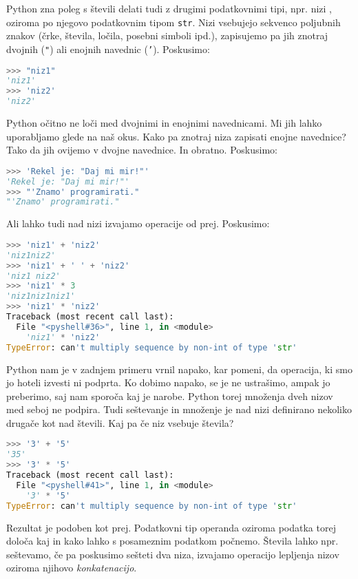 Python zna poleg s števili delati tudi z drugimi podatkovnimi tipi, npr. nizi , oziroma po njegovo podatkovnim tipom \texttt{str}. Nizi vsebujejo sekvenco poljubnih znakov (črke, števila, ločila, posebni simboli ipd.), zapisujemo pa jih znotraj dvojnih (\texttt{"}) ali enojnih navednic (\texttt{'}). Poskusimo:
\begin{lstlisting}[language=Python]
>>> "niz1"
'niz1'
>>> 'niz2'
'niz2'
\end{lstlisting}
Python očitno ne loči med dvojnimi in enojnimi navednicami. Mi jih lahko uporabljamo glede na naš okus. Kako pa znotraj niza zapisati enojne navednice? Tako da jih ovijemo v dvojne navednice. In obratno. Poskusimo:
\begin{lstlisting}[language=Python]
>>> 'Rekel je: "Daj mi mir!"'
'Rekel je: "Daj mi mir!"'
>>> "'Znamo' programirati."
"'Znamo' programirati."
\end{lstlisting}
Ali lahko tudi nad nizi izvajamo operacije od prej. Poskusimo:
\begin{lstlisting}[language=Python]
>>> 'niz1' + 'niz2'
'niz1niz2'
>>> 'niz1' + ' ' + 'niz2'
'niz1 niz2'
>>> 'niz1' * 3
'niz1niz1niz1'
>>> 'niz1' * 'niz2'
Traceback (most recent call last):
  File "<pyshell#36>", line 1, in <module>
    'niz1' * 'niz2'
TypeError: can't multiply sequence by non-int of type 'str'
\end{lstlisting}
Python nam je v zadnjem primeru vrnil napako, kar pomeni, da operacija, ki smo jo hoteli izvesti ni podprta. Ko dobimo napako, se je ne ustrašimo, ampak jo preberimo, saj nam sporoča kaj je narobe. Python torej množenja dveh nizov med seboj ne podpira.
Tudi seštevanje in množenje je nad nizi definirano nekoliko drugače kot nad števili. Kaj pa če niz vsebuje števila?
\begin{lstlisting}[language=Python]
>>> '3' + '5'
'35'
>>> '3' * '5'
Traceback (most recent call last):
  File "<pyshell#41>", line 1, in <module>
    '3' * '5'
TypeError: can't multiply sequence by non-int of type 'str'
\end{lstlisting}
Rezultat je podoben kot prej. Podatkovni tip operanda oziroma podatka torej določa kaj in kako lahko s posameznim podatkom počnemo. Števila lahko npr. seštevamo, če pa poskusimo sešteti dva niza, izvajamo operacijo lepljenja nizov oziroma njihovo \emph{konkatenacijo}. 

